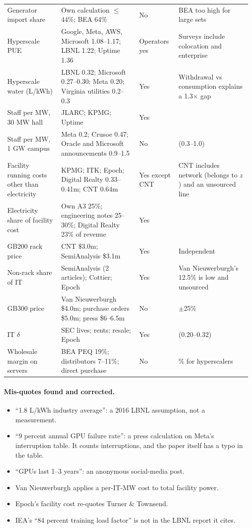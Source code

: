 \begin{longtable}{>{\raggedright\arraybackslash}p{3.2cm}>{\raggedright\arraybackslash}p{5.6cm}>{\raggedright\arraybackslash}p{1.6cm}>{\raggedright\arraybackslash}p{4.0cm}}
Generator import share & Own calculation $\le$44\%; BEA 64\% & No & BEA too high for large sets \\
Hyperscale PUE & Google, Meta, AWS, Microsoft 1.08--1.17; LBNL 1.22; Uptime 1.36 & Operators yes & Surveys include colocation and enterprise \\
Hyperscale water (L/kWh) & LBNL 0.32; Microsoft 0.27--0.30; Meta 0.20; Virginia utilities 0.2--0.3 & Yes & Withdrawal vs consumption explains a 1.3$\times$ gap \\
Staff per MW, 30 MW hall & JLARC; KPMG; Uptime & Yes & 1.3 \\
Staff per MW, 1 GW campus & Meta 0.2; Crusoe 0.47; Oracle and Microsoft announcements 0.9--1.5 & No & 0.5 (0.3--1.0) \\
Facility running costs other than electricity & KPMG; ITK; Epoch; Digital Realty 0.33--0.41m; CNT 0.64m & Yes except CNT & CNT includes network (belongs to $z$) and an unsourced line \\
Electricity share of facility cost & Own A3 25\%; engineering notes 25--30\%; Digital Realty 23\% of revenue & Yes & \\
GB200 rack price & CNT \$3.0m; SemiAnalysis \$3.1m & Yes & Independent \\
Non-rack share of IT & SemiAnalysis (2 articles); Cottier; Epoch & Yes & Van Nieuwerburgh's 12.5\% is low and unsourced \\
GB300 price & Van Nieuwerburgh \$4.0m; purchase orders \$5.0m; press \$6--6.5m & No & $\pm$25\% \\
IT $\delta$ & SEC lives; rents; resale; Epoch & Yes & 0.26 (0.20--0.32) \\
Wholesale margin on servers & BEA PEQ 19\%; distributors 7--11\%; direct purchase & No & 6\% for hyperscalers \\
\bottomrule
\end{longtable}

\paragraph{Mis-quotes found and corrected.}
\begin{itemize}
  \item ``1.8 L/kWh industry average'': a 2016 LBNL assumption, not a measurement.
  \item ``9 percent annual GPU failure rate'': a press calculation on Meta's interruption table.
    It counts interruptions, and the paper itself has a typo in the table.
  \item ``GPUs last 1--3 years'': an anonymous social-media post.
  \item Van Nieuwerburgh applies a per-IT-MW cost to total facility power.
  \item Epoch's facility cost re-quotes Turner \& Townsend.
  \item IEA's ``84 percent training load factor'' is not in the LBNL report it cites.
\end{itemize}


